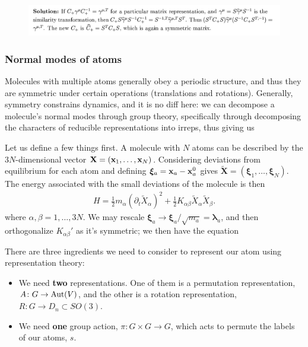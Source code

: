 \documentclass[11pt]{article}
\begin{document}
\begin{figure}[H]
    \centering
    \includegraphics[width=\textwidth]{Figures/pvnsolution.png}
\end{figure}


\subsubsection{Normal modes of atoms}

Molecules with multiple atoms generally obey
a periodic structure, and thus they are symmetric
under certain operations (translations and rotations).
Generally, symmetry constrains dynamics, and it is no diff
here: we can decompose a molecule's normal modes through
group theory, specifically through decomposing the characters
of reducible representations into irreps, thus giving us 

Let us define a few things first. A molecule with $N$ atoms
can be described by the $3N$-dimensional vector $\mathbf{X} = (\mathbf{x}_1, \ldots, \mathbf{x}_N)$.
Considering deviations from equilibrium for each atom
and defining $\boldsymbol{\xi}_a = \mathbf{x}_a - \mathbf{x}_a^0$
gives $\widetilde{\mathbf{X}} = (\boldsymbol{\xi}_1, \ldots, \boldsymbol{\xi}_N)$.
The energy associated with the small deviations of the molecule is
then
\begin{align*}
    H = \frac{1}{2}m_\alpha (\partial_t \widetilde{X}_\alpha)^2 + \frac{1}{2}K_{\alpha \beta} \widetilde{X}_\alpha \widetilde{X}_\beta.
\end{align*}
where $\alpha, \beta = 1, \ldots, 3N$. We may rescale 
$\boldsymbol{\xi}_a \to \boldsymbol{\xi}_a/\sqrt{m_a} = \boldsymbol{\lambda}_a$,
and then orthogonalize $K_{\alpha \beta}'$ as it's symmetric;
we then have the equation 


There are three ingredients we need to consider
to represent our atom using representation theory:
\begin{itemize}
    \item We need \textbf{two} representations. One of them
    is a permutation representation, $A \colon G \to \operatorname{Aut}(V)$,
    and the other is a rotation representation, $R \colon G \to D_n \subset SO(3)$.
    \item We need \textbf{one} group action, $\pi \colon G \times G \to G$,
    which acts to permute the labels of our atoms, $s$.
\end{itemize}
\end{document}
